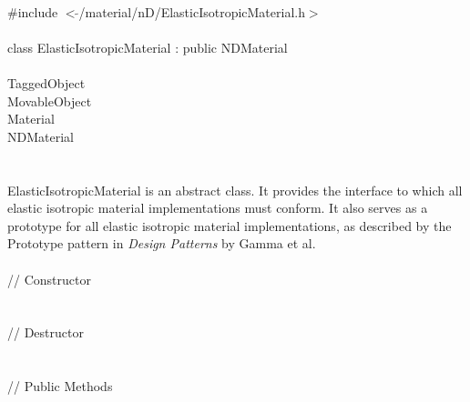 
   \\
\indent \#include $<\tilde{ }$/material/nD/ElasticIsotropicMaterial.h$>$  \\

  \\
\indent class ElasticIsotropicMaterial : public NDMaterial \\

 \\
\indent TaggedObject \\
\indent MovableObject \\
\indent\indent Material \\
\indent\indent\indent NDMaterial \\
\indent\indent\indent{} \\

  \\
ElasticIsotropicMaterial is an abstract class.  It provides the
interface to which all elastic isotropic material implementations
must conform.  It also serves as a prototype for all elastic isotropic
material implementations, as described by the Prototype pattern in
{\em Design Patterns} by Gamma et al. \\

 \\
\indent // Constructor \\
  \\ \\
\indent // Destructor \\
\\ \\
\indent // Public Methods \\
 \\
 \\
 \\
 \\
 \\
 \\
 \\
 \\

